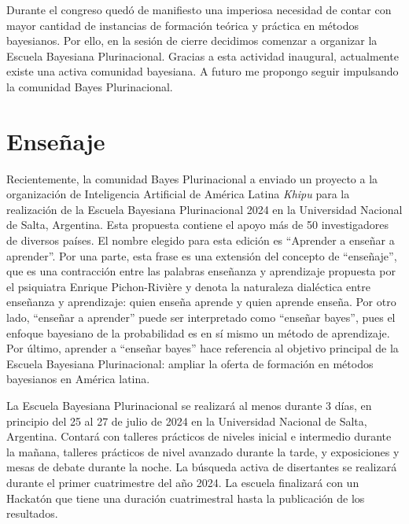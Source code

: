 \documentclass[a4paper,11pt]{book}
\theoremstyle{definition}
\begin{document}


Durante el congreso qued\'o de manifiesto una imperiosa necesidad de contar con mayor cantidad de instancias de formaci\'on te\'orica y pr\'actica en m\'etodos bayesianos.
%
Por ello, en la sesi\'on de cierre decidimos comenzar a organizar la Escuela Bayesiana Plurinacional.
%
Gracias a esta actividad inaugural, actualmente existe una activa comunidad bayesiana.
%
A futuro me propongo seguir impulsando la comunidad Bayes Plurinacional.


\section{Ense\~naje}

Recientemente, la comunidad Bayes Plurinacional a enviado un proyecto a la organizaci\'on de Inteligencia Artificial de Am\'erica Latina \emph{Khipu} para la realizaci\'on de la Escuela Bayesiana Plurinacional 2024 en la Universidad Nacional de Salta, Argentina.
%
Esta propuesta contiene el apoyo m\'as de 50 investigadores de diversos pa\'ises.
%
El nombre elegido para esta edici\'on es ``Aprender a ense\~nar a aprender''.
%
Por una parte, esta frase es una extensi\'on del concepto de ``ense\~naje'', que es una contracci\'on entre las palabras ense\~nanza y aprendizaje propuesta por el psiquiatra Enrique Pichon-Rivi\`ere y denota la naturaleza dial\'ectica entre ense\~nanza y aprendizaje: quien ense\~na aprende y quien aprende ense\~na.
%
Por otro lado, ``ense\~nar a aprender'' puede ser interpretado como ``ense\~nar bayes'', pues el enfoque bayesiano de la probabilidad es en s\'i mismo un m\'etodo de aprendizaje.
%
Por \'ultimo, aprender a ``ense\~nar bayes'' hace referencia al objetivo principal de la Escuela Bayesiana Plurinacional: ampliar la oferta de formaci\'on en m\'etodos bayesianos en Am\'erica latina.


La Escuela Bayesiana Plurinacional se realizar\'a al menos durante 3 d\'ias, en principio del 25 al 27 de julio de 2024 en la Universidad Nacional de Salta, Argentina.
%
Contar\'a con talleres pr\'acticos de niveles inicial e intermedio durante la ma\~nana, talleres pr\'acticos de nivel avanzado durante la tarde, y exposiciones y mesas de debate durante la noche.
%
La b\'usqueda activa de disertantes se realizar\'a durante el primer cuatrimestre del a\~no 2024.
%
La escuela finalizar\'a con un Hackat\'on que tiene una duraci\'on cuatrimestral hasta la publicaci\'on de los resultados.
\end{document}
